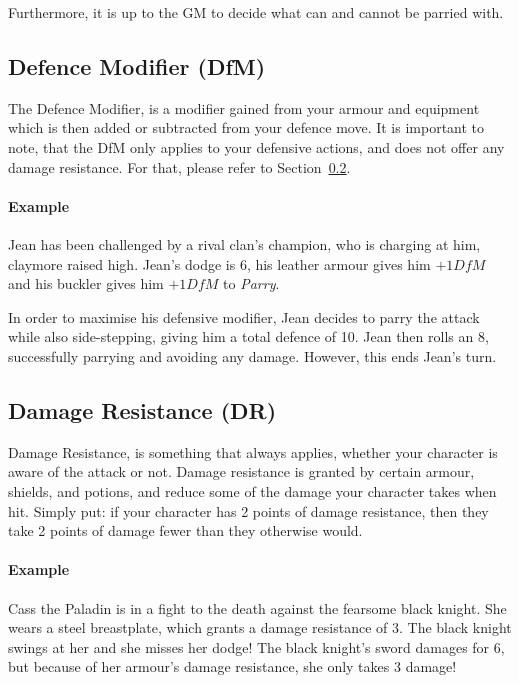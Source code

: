 Furthermore, it is up to the GM to decide what can and cannot be parried with.

\subsection{Defence Modifier (DfM)}\label{sec:defence-modifier}
The Defence Modifier, is a modifier gained from your armour and equipment which is then added or subtracted from your defence move.
It is important to note, that the DfM only applies to your defensive actions, and does not offer any damage resistance. 
For that, please refer to Section~\ref{sec:damage-resistance}.

\paragraph{Example} Jean has been challenged by a rival clan's champion, who is charging at him, claymore raised high.
Jean's dodge is 6, his leather armour gives him $+1 \mathit{DfM}$ and his buckler gives him $+1 \mathit{DfM}$ to \textit{Parry}.

In order to maximise his defensive modifier, Jean decides to parry the attack while also side-stepping, giving him a total defence of 10.
Jean then rolls an 8, successfully parrying and avoiding any damage.
However, this ends Jean's turn.

\subsection{Damage Resistance (DR)}\label{sec:damage-resistance}
Damage Resistance, is something that always applies, whether your character is aware of the attack or not.
Damage resistance is granted by certain armour, shields, and potions, and reduce some of the damage your character takes when hit.
Simply put: if your character has 2 points of damage resistance, then they take 2 points of damage fewer than they otherwise would.

\paragraph{Example} Cass the Paladin is in a fight to the death against the fearsome black knight.
She wears a steel breastplate, which grants a damage resistance of 3.
The black knight swings at her and she misses her dodge!
The black knight's sword damages for 6, but because of her armour's damage resistance, she only takes 3 damage!

